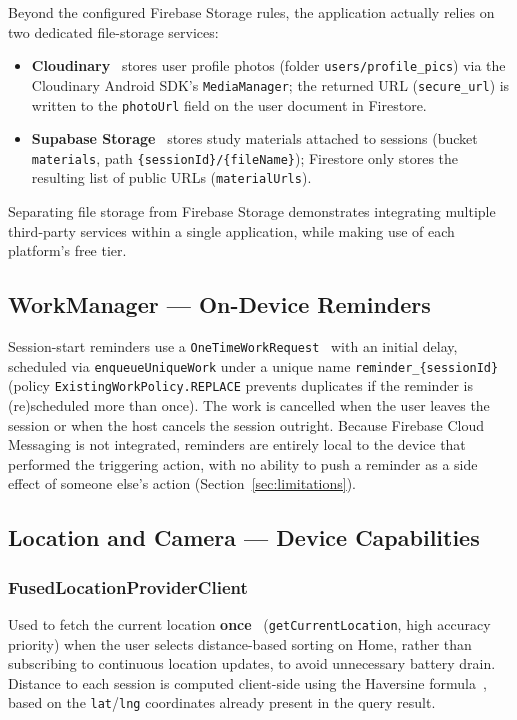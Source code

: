 Beyond the configured Firebase Storage rules, the application actually relies on two dedicated file-storage services:
\begin{itemize}
    \item \textbf{Cloudinary}~\cite{cloudinary-docs} stores user profile photos (folder \texttt{users/profile\_pics}) via the Cloudinary Android SDK's \texttt{MediaManager}; the returned URL (\texttt{secure\_url}) is written to the \texttt{photoUrl} field on the user document in Firestore.
    \item \textbf{Supabase Storage}~\cite{supabase-storage} stores study materials attached to sessions (bucket \texttt{materials}, path \texttt{\{sessionId\}/\{fileName\}}); Firestore only stores the resulting list of public URLs (\texttt{materialUrls}).
\end{itemize}

Separating file storage from Firebase Storage demonstrates integrating multiple third-party services within a single application, while making use of each platform's free tier.

\subsection{WorkManager — On-Device Reminders}

Session-start reminders use a \texttt{OneTimeWorkRequest}~\cite{android-workmanager} with an initial delay, scheduled via \texttt{enqueueUniqueWork} under a unique name \texttt{reminder\_\{sessionId\}} (policy \texttt{ExistingWorkPolicy.REPLACE} prevents duplicates if the reminder is (re)scheduled more than once). The work is cancelled when the user leaves the session or when the host cancels the session outright. Because Firebase Cloud Messaging is not integrated, reminders are entirely local to the device that performed the triggering action, with no ability to push a reminder as a side effect of someone else's action (Section~\ref{sec:limitations}).

\subsection{Location and Camera — Device Capabilities}

\subsubsection{FusedLocationProviderClient}
Used to fetch the current location \textbf{once}~\cite{android-location} (\texttt{getCurrentLocation}, high accuracy priority) when the user selects distance-based sorting on Home, rather than subscribing to continuous location updates, to avoid unnecessary battery drain. Distance to each session is computed client-side using the Haversine formula~\cite{haversine}, based on the \texttt{lat}/\texttt{lng} coordinates already present in the query result.

